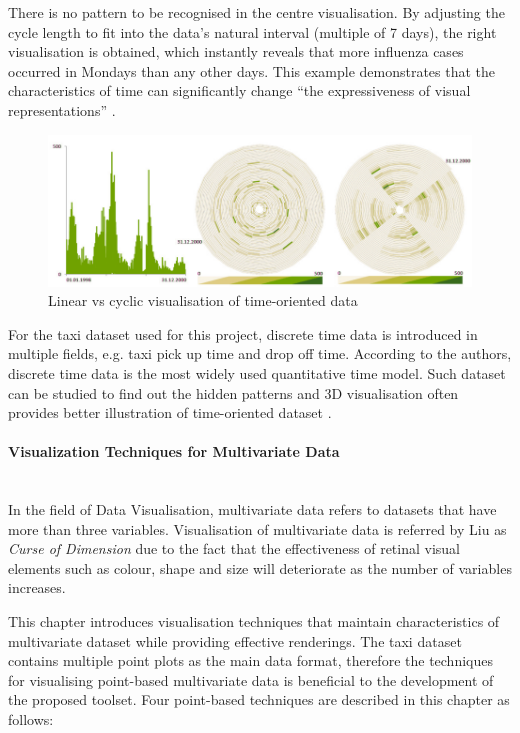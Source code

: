 \documentclass[doc,natbib]{apa6}
\begin{document}
There is no pattern to be recognised in the centre visualisation. By adjusting the cycle length to fit into the data's natural interval (multiple of 7 days), the right visualisation is obtained, which instantly reveals that more influenza cases occurred in Mondays than any other days. This example demonstrates that the characteristics of time can significantly change ``the expressiveness of visual representations'' \citep[p. 254]{Ward2010}.

\begin{figure}[H]
	\centering
	\includegraphics{figures/fig3.png}
	\caption{\label{fig:3}Linear vs cyclic visualisation of time-oriented data \citep[p. 255]{Ward2010}}
\end{figure}

For the taxi dataset used for this project, discrete time data is introduced in multiple fields, e.g. taxi pick up time and drop off time. According to the authors, discrete time data is the most widely used quantitative time model. Such dataset can be studied to find out the hidden patterns and 3D visualisation often provides better illustration of time-oriented dataset \citep[pp. 258-263]{Ward2010}.

\paragraph{Visualization Techniques for Multivariate Data}\hfil\\
In the field of Data Visualisation, multivariate data refers to datasets that have more than three variables. Visualisation of multivariate data is referred by Liu \citep{Liu} as \textit{Curse of Dimension} due to the fact that the effectiveness of retinal visual elements such as colour, shape and size will deteriorate as the number of variables increases.

This chapter introduces visualisation techniques that maintain characteristics of multivariate dataset while providing effective renderings. The taxi dataset contains multiple point plots as the main data format, therefore the techniques for visualising point-based multivariate data is beneficial to the development of the proposed toolset. Four point-based techniques are described \citep[pp. 285-292]{Ward2010} in this chapter as follows:
\end{document}
